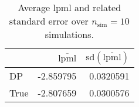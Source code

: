 \begin{table}[H]

\caption{Average lpml and related standard error over $n_{\text{sim}} = 10$ simulations.}
\centering
\begin{tabular}[t]{lrr}
\toprule
  & $\overbar{\text{lpml}}$ & $\text{sd}(\overbar{\text{lpml}})$\\
\midrule
DP & -2.859795 & 0.0320591\\
True & -2.807659 & 0.0300576\\
\bottomrule
\end{tabular}
\end{table}